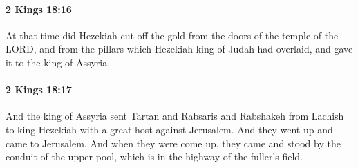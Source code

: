 		\paragraph{2 Kings 18:16} %
			\label{2KINGS-18-16}

			At that time did Hezekiah cut off the gold from the doors of the temple of the LORD, and from the pillars which Hezekiah king of Judah had overlaid, and gave it to the king of Assyria.


		\paragraph{2 Kings 18:17} %
			\label{2KINGS-18-17}

			And the king of Assyria sent Tartan and Rabsaris and Rabshakeh from Lachish to king Hezekiah with a great host against Jerusalem. And they went up and came to Jerusalem. And when they were come up, they came and stood by the conduit of the upper pool, which is in the highway of the fuller’s field.

